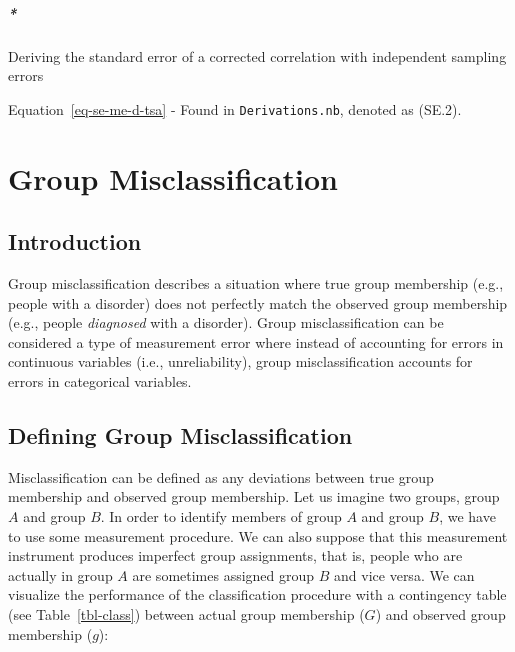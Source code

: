 \documentclass[
  letterpaper,
  DIV=11,
  numbers=noendperiod]{scrreprt}
\let\oldparagraph\paragraph
\renewcommand{\paragraph}[1]{\oldparagraph{#1}\mbox{}}
\begin{document}
\paragraph*{Deriving the standard error of a corrected correlation with
independent sampling
errors}\label{deriving-the-standard-error-of-a-corrected-correlation-with-independent-sampling-errors-1}

Equation~\ref{eq-se-me-d-tsa} - Found in \texttt{Derivations.nb},
denoted as (SE.2).


\chapter{Group Misclassification}\label{group-misclassification}

\section{Introduction}\label{introduction-3}

Group misclassification describes a situation where true group
membership (e.g., people with a disorder) does not perfectly match the
observed group membership (e.g., people \emph{diagnosed} with a
disorder). Group misclassification can be considered a type of
measurement error where instead of accounting for errors in continuous
variables (i.e., unreliability), group misclassification accounts for
errors in categorical variables.

\section{Defining Group
Misclassification}\label{defining-group-misclassification}

Misclassification can be defined as any deviations between true group
membership and observed group membership. Let us imagine two groups,
group \(A\) and group \(B\). In order to identify members of group \(A\)
and group \(B\), we have to use some measurement procedure. We can also
suppose that this measurement instrument produces imperfect group
assignments, that is, people who are actually in group \(A\) are
sometimes assigned group \(B\) and vice versa. We can visualize the
performance of the classification procedure with a contingency table
(see Table~\ref{tbl-class}) between actual group membership (\(G\)) and
observed group membership (\(g\)):
\end{document}
